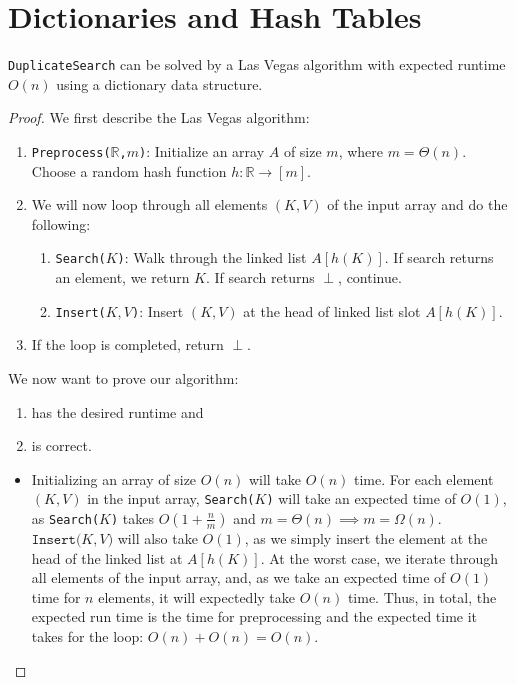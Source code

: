 \documentclass[11pt]{scrartcl}
\theoremstyle{dotlessP}
\theoremstyle{dotlessN}
\newcommand{\reals}{\mathbb{R}} %
\begin{document}
\section{Dictionaries and Hash Tables}
\begin{claim*}
	\texttt{DuplicateSearch} can be solved by a Las Vegas algorithm with expected runtime $O(n)$ using a dictionary data structure.
\end{claim*}
\begin{proof}
	We first describe the Las Vegas algorithm:
	\begin{enumerate}
		\item \texttt{Preprocess($\reals$,$m$)}: Initialize an array $A$ of size $m$, where $m = \Theta(n)$. Choose a random hash function $h: \reals \to [m]$.
		\item We will now loop through all elements $(K,V)$ of the input array and do the following:
			\begin{enumerate}
				\item \texttt{Search($K$)}: Walk through the linked list $A[h(K)]$. If search returns an element, we return $K$. If search returns $\perp$, continue.
				\item \texttt{Insert($K,V$)}: Insert $(K,V)$ at the head of linked list slot $A[h(K)]$.
			\end{enumerate}
		\item If the loop is completed, return $\perp$.
	\end{enumerate}
	We now want to prove our algorithm:
	\begin{enumerate}
		\item has the desired runtime and
		\item is correct.
	\end{enumerate}
	\begin{itemize}
		\item Initializing an array of size  $O(n)$ will take $O(n)$ time. For each element $(K,V)$ in the input array, \texttt{Search($K$)} will take an expected time of $O(1)$, as \texttt{Search($K$)} takes $O(1 + \frac{n}{m})$ and $m = \Theta(n) \implies m = \Omega(n)$. $\texttt{Insert($K,V$)}$ will also take $O(1)$, as we simply insert the element at the head of the linked list at $A[h(K)]$. At the worst case, we iterate through all elements of the input array, and, as we take an expected time of $O(1)$ time for $n$ elements, it will expectedly take $O(n)$ time. Thus, in total, the expected run time is the time for preprocessing and the expected time it takes for the loop: $O(n) + O(n) = O(n)$.

\end{itemize}
\end{proof}
\end{document}

